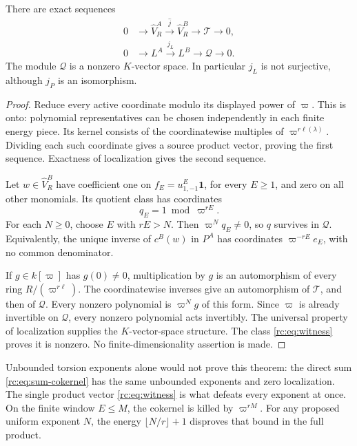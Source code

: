 \begin{theorem}\label{rc:thm:cokernel}
There are exact sequences
\begin{equation}\label{rc:eq:exact}
\begin{aligned}
 0&\longrightarrow\widehat V_R^A
   \xrightarrow{\widehat j}\widehat V_R^B
   \longrightarrow\mathcal T\longrightarrow0,\\
 0&\longrightarrow L^A\xrightarrow{j_L}L^B
   \longrightarrow\mathcal Q\longrightarrow0.
\end{aligned}
\end{equation}
The module \(\mathcal Q\) is a nonzero \(K\)-vector space.
In particular \(j_L\) is not surjective, although \(j_P\) is
an isomorphism.
\end{theorem}
\begin{proof}
Reduce every active coordinate modulo its displayed power of
\(\varpi\).  This is onto: polynomial representatives can be
chosen independently in each finite energy piece.  Its kernel
consists of the coordinatewise multiples of
\(\varpi^{r\ell(\lambda)}\).  Dividing each such coordinate
gives a source product vector, proving the first sequence.
Exactness of localization gives the second sequence.

Let \(w\in\widehat V_R^B\) have coefficient one on
\(f_E=u_{1,-1}^E\mathbf1\), for every \(E\geq1\), and zero
on all other monomials.  Its quotient class has coordinates
\begin{equation}\label{rc:eq:witness}
 q_E=1\bmod\varpi^{rE}.
\end{equation}
For each \(N\geq0\), choose \(E\) with \(rE>N\).
Then \(\varpi^Nq_E\ne0\), so \(q\) survives in \(\mathcal Q\).
Equivalently, the unique inverse of \(c^B(w)\) in \(P^A\)
has coordinates \(\varpi^{-rE}e_E\), with no common denominator.

If \(g\in k[\varpi]\) has \(g(0)\ne0\), multiplication by
\(g\) is an automorphism of every ring
\(R/(\varpi^{r\ell})\).  The coordinatewise inverses give
an automorphism of \(\mathcal T\), and then of \(\mathcal Q\).
Every nonzero polynomial is \(\varpi^Ng\) of this form.
Since \(\varpi\) is already invertible on \(\mathcal Q\),
every nonzero polynomial acts invertibly.  The universal
property of localization supplies the \(K\)-vector-space
structure.  The class \eqref{rc:eq:witness} proves it is nonzero.
No finite-dimensionality assertion is made.
\end{proof}

Unbounded torsion exponents alone would not prove this theorem:
the direct sum \eqref{rc:eq:sum-cokernel} has the same unbounded
exponents and zero localization.  The single product vector
\eqref{rc:eq:witness} is what defeats every exponent at once.
On the finite window \(E\leq M\), the cokernel is killed by
\(\varpi^{rM}\).  For any proposed uniform exponent \(N\),
the energy \(\lfloor N/r\rfloor+1\) disproves that bound in the
full product.

